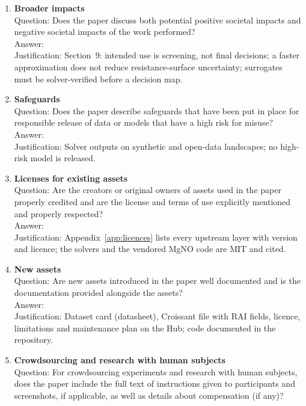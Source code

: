 \documentclass{article}
\begin{document}
\begin{enumerate}
    Answer: \answerYes{}\\
    Justification: No human subjects, no personal data; licences of every source respected (Appendix~\ref{app:licences}).
\item {\bf Broader impacts}\\
    Question: Does the paper discuss both potential positive societal impacts and negative societal impacts of the work performed?\\
    Answer: \answerYes{}\\
    Justification: Section~9: intended use is screening, not final decisions; a faster approximation does not reduce resistance-surface uncertainty; surrogates must be solver-verified before a decision map.
\item {\bf Safeguards}\\
    Question: Does the paper describe safeguards that have been put in place for responsible release of data or models that have a high risk for misuse?\\
    Answer: \answerNA{}\\
    Justification: Solver outputs on synthetic and open-data landscapes; no high-risk model is released.
\item {\bf Licenses for existing assets}\\
    Question: Are the creators or original owners of assets used in the paper properly credited and are the license and terms of use explicitly mentioned and properly respected?\\
    Answer: \answerYes{}\\
    Justification: Appendix~\ref{app:licences} lists every upstream layer with version and licence; the solvers and the vendored MgNO code are MIT and cited.
\item {\bf New assets}\\
    Question: Are new assets introduced in the paper well documented and is the documentation provided alongside the assets?\\
    Answer: \answerYes{}\\
    Justification: Dataset card (datasheet), Croissant file with RAI fields, licence, limitations and maintenance plan on the Hub; code documented in the repository.
\item {\bf Crowdsourcing and research with human subjects}\\
    Question: For crowdsourcing experiments and research with human subjects, does the paper include the full text of instructions given to participants and screenshots, if applicable, as well as details about compensation (if any)?\\

\end{enumerate}
\end{document}
